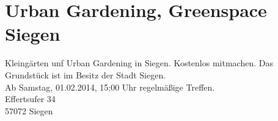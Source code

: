 \section{Urban Gardening, Greenspace Siegen}
Kleingärten unf Urban Gardening in Siegen. Kostenlos mitmachen. Das Grundstück ist im Besitz der Stadt Siegen.\\
Ab Samstag, 01.02.2014, 15:00 Uhr regelmäßige Treffen.\\
Effertsufer 34\\
57072 Siegen